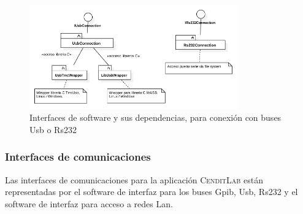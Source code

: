 \documentclass[paper=a4,oneside,fontsize=12pt]{article}
\newcommand{\AppName}{\textsc{CenditLab}\xspace}
\begin{document}
	\begin{figure}[H]
		\centering
		\includegraphics[width=0.8\textwidth]{Imagenes/CommunicationAbstractionLayerPackages3.pdf}
		\caption{Interfaces de software y sus dependencias, para conexión con buses Usb o Rs232}
		\label{Fig:CalPackages2}		
	\end{figure}
	
	\subsubsection{Interfaces de comunicaciones}
	
	Las interfaces de comunicaciones para la aplicación \AppName están representadas por el software de interfaz para los buses Gpib, Usb, Rs232 y el software de interfaz para acceso a redes Lan.
	
	
		\newcommand{\funcreq}[7]{
			\subsubsection{Requerimiento funcional {#1}}

			\begin{table}[H]			
				\begin{tabularx}{\textwidth}{rX}			
					\textbf{ID:} 	&	{#2}		\\
					Titulo:			&  	{#3}. 		\\
					Descripción:	&	{#4}.		\\
					Justificación: 	&	{#5}.		\\
					Dependencias:	& 	{#6}.		\\
					Usuario:		&	{#7}.		\\
				\end{tabularx}				
			\end{table}
		}
		
\end{document}
